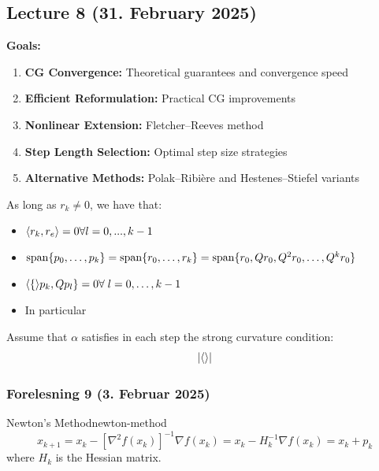 \subsection{Lecture 8 (31. February 2025)}

\textbf{Goals:}
\begin{enumerate}
    \item \textbf{CG Convergence:} Theoretical guarantees and convergence speed
    \item \textbf{Efficient Reformulation:} Practical CG improvements
    \item \textbf{Nonlinear Extension:} Fletcher--Reeves method
    \item \textbf{Step Length Selection:} Optimal step size strategies
    \item \textbf{Alternative Methods:} Polak--Ribière and Hestenes--Stiefel variants
\end{enumerate}

\begin{theorem}{}{}
    As long as \(r_k \neq 0\), we have that:
    \begin{itemize}
        \item \(\langle r_k, r_e\rangle=0 \forall l = 0,...,k-1 \)
        \item \(\operatorname{span}\{p_0,\ldots, p_k\} = \operatorname{span}\{r_0, \ldots, r_k\} = \operatorname{span}\{r_0, Qr_0, Q^2r_0,\ldots, Q^k r_0\}\)
        \item \(\langle\{\rangle p_k, Qp_l\} = 0 \forall \; l=0,\ldots,k-1\)
        \item In particular 
    \end{itemize}
\end{theorem}

\begin{lemma}{}{}
    Assume that \(\alpha\) satisfies in each step the strong curvature condition:
    \[
    \left|\langle\rangle\right|
    \]

\end{lemma}

\subsubsection{Forelesning 9 (3. Februar 2025)}

\begin{definition}{Newton's Method}{newton-method}
    \[
    x_{k+1} = x_k - [\nabla^2 f(x_k)]^{-1} \nabla f(x_k) = x_k - H_k^{-1} \nabla f(x_k) = x_k + p_k
    \]
    where \( H_k \) is the Hessian matrix.
\end{definition}

